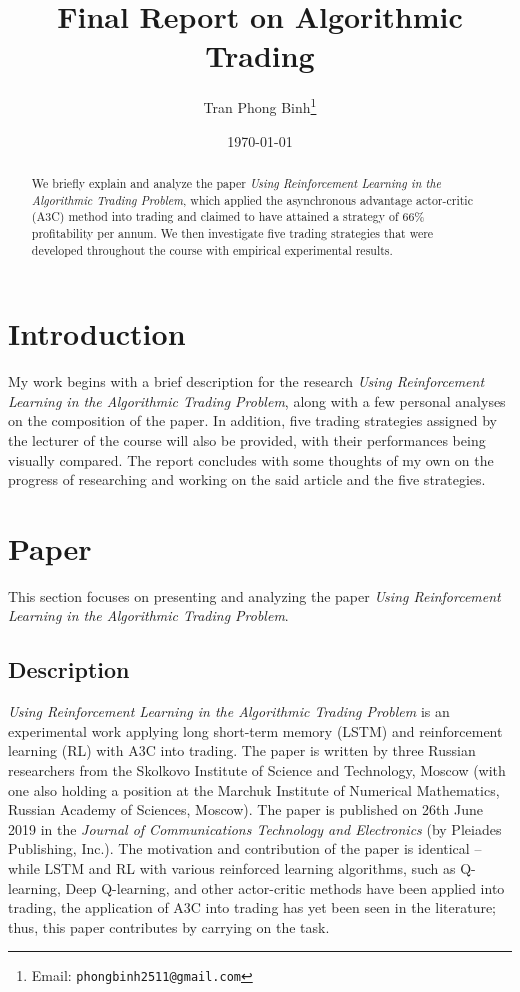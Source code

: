 \documentclass[12pt, letterpaper, oneside]{article}
\title{Final Report on Algorithmic Trading}
\author{Tran Phong Binh\thanks{Email: \texttt{phongbinh2511@gmail.com}}}
\affil{Department of Computer Science and Information Technology,
National Taipei University of Technology, Taipei}
\date{\today}
\begin{document}
\maketitle

\begin{abstract}
We briefly explain and analyze the paper \textit{Using Reinforcement Learning in the Algorithmic Trading Problem}\cite{a3c_trading}, which applied the asynchronous advantage actor-critic (A3C) method into trading and claimed to have attained a strategy of 66\% profitability per annum. We then investigate five trading strategies that were developed throughout the course with empirical experimental results.
\end{abstract}

\section{Introduction}
My work begins with a brief description for the research \textit{Using Reinforcement Learning in the Algorithmic Trading Problem}, along with a few personal analyses on the composition of the paper. In addition, five trading strategies assigned by the lecturer of the course will also be provided, with their performances being visually compared. The report concludes with some thoughts of my own on the progress of researching and working on the said article and the five strategies.

\section{Paper}
This section focuses on presenting and analyzing the paper \textit{Using Reinforcement Learning in the Algorithmic Trading Problem}.

\subsection{Description}
\textit{Using Reinforcement Learning in the Algorithmic Trading Problem} is an experimental work applying long short-term memory (LSTM) and reinforcement learning (RL) with A3C into trading. The paper is written by three Russian researchers from the Skolkovo Institute of Science and Technology, Moscow (with one also holding a position at the Marchuk Institute of Numerical Mathematics, Russian Academy of Sciences, Moscow). The paper is published on 26th June 2019 in the \textit{Journal of Communications Technology and Electronics} (by Pleiades Publishing, Inc.). The motivation and contribution of the paper is identical -- while LSTM and RL with various reinforced learning algorithms, such as Q-learning\cite{q_learning}, Deep Q-learning\cite{deep}, and other actor-critic methods\cite{ac1, ac2} have been applied into trading, the application of A3C into trading has yet been seen in the literature; thus, this paper contributes by carrying on the task.
\end{document}
